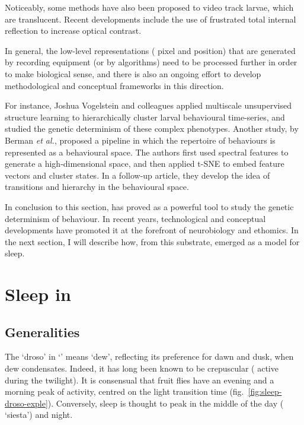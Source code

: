 Noticeably, some methods have also been proposed to video track larvae, which are translucent\cite{pistori_mice_2010,sinadinos_increased_2012,swierczek_high-throughput_2011}. 
Recent developments include the use of frustrated total internal reflection to increase optical contrast\cite{risse_fim_2013,risse_quantifying_2015}.

In general, the low-level representations (\eg{} pixel and position) that are generated by recording equipment (or by algorithms) need to be processed further in order to make biological sense, and there is also an ongoing effort to develop methodological and conceptual frameworks in this direction\cite{brown_ethology_2018, berman_measuring_2018}.

For instance, Joshua Vogelstein and colleagues applied multiscale unsupervised structure
learning\cite{rockmore_modern_2004} to hierarchically cluster larval behavioural time-series, and studied the genetic determinism of
these complex phenotypes\cite{vogelstein_discovery_2014}.
Another study, by  Berman \emph{et al.}, proposed a pipeline in which the repertoire of behaviours is represented as a behavioural space\cite{berman_mapping_2014}.
The authors first used spectral features to generate a high-dimensional space, and then applied t-SNE\cite{maaten_visualizing_2008} to embed feature vectors and cluster states.
In a follow-up article, they develop the idea of transitions and hierarchy in the behavioural space\cite{berman_predictability_2016}.


In conclusion to this section, \droso{} has proved as a powerful tool to study the genetic determinism of behaviour.
In recent years, technological and conceptual developments have promoted it at the forefront of neurobiology and ethomics.
In the next section, I will describe how, from this substrate, \droso{} emerged as a model for sleep.


\clearpage
\section{Sleep in \dmel}
\label{sec:sleep-droso}

\subsection{Generalities}

The `droso' in `\droso{}' means{} `dew', reflecting its preference for dawn and dusk, when dew condensates. 
Indeed, it has long been known to be crepuscular (\ie{} active during the twilight).
It is consensual that fruit flies have an evening and a morning peak of activity, 
centred on the light transition time (fig.~\ref{fig:sleep-droso-exple}).
Conversely, sleep is thought to peak in the middle of the day (\ie{} `siesta') and night.


